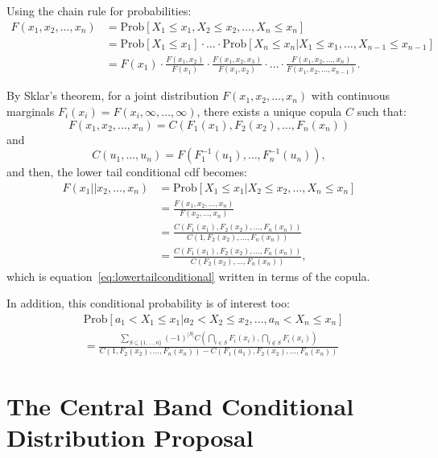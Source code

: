 Using the chain rule for probabilities:
\begin{align}
F(x_1, x_2,\ldots, x_n) &= \text{Prob}[X_1 \leq x_1, X_2 \leq x_2,\ldots, X_n \leq x_n] \nonumber\\
&= \text{Prob}[X_1 \leq x_1] \cdot \ldots \cdot \text{Prob}[X_n \leq x_n | X_1 \leq x_1,\ldots, X_{n-1} \leq x_{n-1}] \nonumber\\
&= F(x_1) \cdot \frac{F(x_1, x_2)}{F(x_1)} \cdot \frac{F(x_1, x_2, x_3)}{F(x_1, x_2)} \cdot \ldots \cdot \frac{F(x_1, x_2,\ldots, x_n)}{F(x_1, x_2,\ldots, x_{n-1})}.
\end{align}

By Sklar's theorem, for a joint distribution $F(x_1, x_2,\ldots, x_n)$ with continuous marginals $F_i(x_i) = F(x_i,\infty,\ldots,\infty)$, there exists a unique copula $C$ such that:
\begin{equation}
F(x_1, x_2,\ldots, x_n) = C(F_1(x_1),F_2(x_2),\ldots,F_n(x_n))
\label{eq:sklarapplication}
\end{equation}
and
\begin{equation}
C(u_1,\ldots,u_n) = F(F_1^{-1}(u_1),\ldots,F_n^{-1}(u_n)),
\label{eq:copulainverse}
\end{equation}
and then, the lower tail conditional cdf becomes:
\begin{align}
F(x_1 || x_2,\ldots, x_n) &= \text{Prob}[X_1 \leq x_1|X_2 \leq x_2,\ldots,X_n \leq x_n] \nonumber\\
&= \frac{F(x_1, x_2,\ldots, x_n)}{F(x_2,\ldots, x_n)} \nonumber\\
&= \frac{C(F_1(x_1),F_2(x_2),\ldots,F_n(x_n))}{C(1,F_2(x_2),\ldots,F_n(x_n))} \nonumber\\
&= \frac{C(F_1(x_1),F_2(x_2),\ldots,F_n(x_n))}{C(F_2(x_2),\ldots,F_n(x_n))},
\label{eq:copulaconditional}
\end{align}
which is equation~\eqref{eq:lowertailconditional} written in terms of the copula.

In addition, this conditional probability is of interest too:
\begin{align}
&\text{Prob}[a_1 < X_1 \leq x_1 | a_2 < X_2 \leq x_2,\ldots, a_n < X_n \leq x_n] \nonumber\\
&= \frac{\sum_{S \subseteq \{1,\ldots, n\}} (-1)^{|S|} C\left( \bigcap_{i \in S} F_i(x_i), \bigcap_{i \notin S} F_i(x_i) \right)}{C(1,F_2(x_2),\ldots,F_n(x_n)) - C(F_1(a_1),F_2(x_2),\ldots,F_n(x_n))}
\end{align}

\section{The Central Band Conditional Distribution Proposal}

